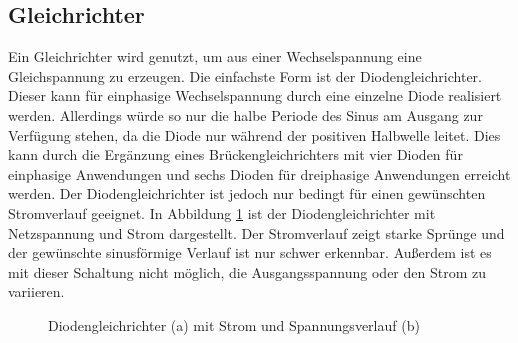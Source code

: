 		\subsection{Gleichrichter}
		\label{sec:Rec}
		Ein Gleichrichter wird genutzt, um aus einer Wechselspannung eine Gleichspannung zu erzeugen. Die einfachste Form ist der Diodengleichrichter. Dieser kann für einphasige Wechselspannung durch eine einzelne Diode realisiert werden. Allerdings würde so nur die halbe Periode des Sinus am Ausgang zur Verfügung stehen, da die Diode nur während der positiven Halbwelle leitet. Dies kann durch die Ergänzung eines Brückengleichrichters mit vier Dioden für einphasige Anwendungen und sechs Dioden für dreiphasige Anwendungen erreicht werden.
		Der Diodengleichrichter ist jedoch nur bedingt für einen gewünschten Stromverlauf geeignet. In Abbildung \ref{fig:B6DiodRect} ist der Diodengleichrichter mit Netzspannung und Strom dargestellt. Der Stromverlauf zeigt starke Sprünge und der gewünschte sinusförmige Verlauf ist nur schwer erkennbar. Außerdem ist es mit dieser Schaltung nicht möglich, die Ausgangsspannung oder den Strom zu variieren.
		\begin{figure}[H]
			\centering
			\qquad
			\caption{Diodengleichrichter (a) mit Strom und Spannungsverlauf (b)}
			\label{fig:B6DiodRect}
		\end{figure}
		
